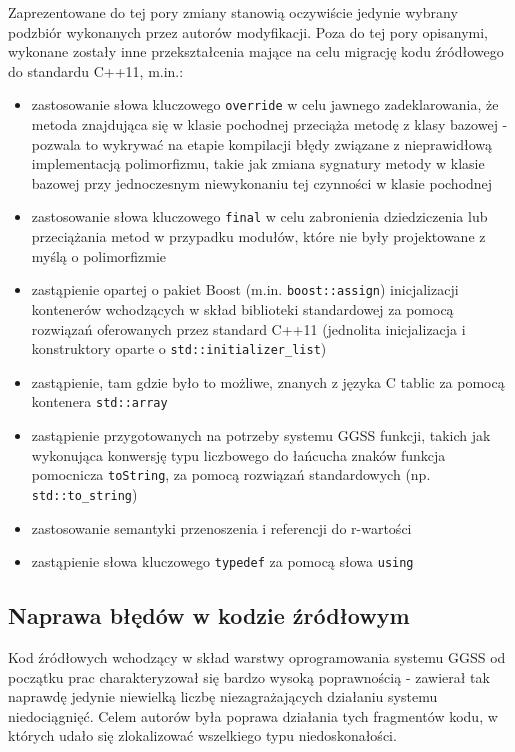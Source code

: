 Zaprezentowane do tej pory zmiany stanowią oczywiście jedynie wybrany podzbiór wykonanych przez autorów modyfikacji. Poza do tej pory opisanymi, wykonane zostały inne przekształcenia mające na celu migrację kodu źródłowego do standardu C++11, m.in.:
\begin{itemize}
    \item zastosowanie słowa kluczowego \lstinline{override} w celu jawnego zadeklarowania, że metoda znajdująca się w klasie pochodnej przeciąża metodę z klasy bazowej - pozwala to wykrywać na etapie kompilacji błędy związane z nieprawidłową implementacją polimorfizmu, takie jak zmiana sygnatury metody w klasie bazowej przy jednoczesnym niewykonaniu tej czynności w klasie pochodnej
    \item zastosowanie słowa kluczowego \lstinline{final} w celu zabronienia dziedziczenia lub przeciążania metod w przypadku modułów, które nie były projektowane z myślą o polimorfizmie
    \item zastąpienie opartej o pakiet Boost (m.in. \lstinline{boost::assign}) inicjalizacji kontenerów wchodzących w skład biblioteki standardowej za pomocą rozwiązań oferowanych przez standard C++11 (jednolita inicjalizacja i konstruktory oparte o \lstinline{std::initializer_list})
    \item zastąpienie, tam gdzie było to możliwe, znanych z języka C tablic za pomocą kontenera \lstinline{std::array}
    \item zastąpienie przygotowanych na potrzeby systemu GGSS funkcji, takich jak wykonująca konwersję typu liczbowego do łańcucha znaków funkcja pomocnicza \lstinline{toString}, za pomocą rozwiązań standardowych (np. \lstinline{std::to_string})
    \item zastosowanie semantyki przenoszenia i referencji do r-wartości
    \item zastąpienie słowa kluczowego \lstinline{typedef} za pomocą słowa \lstinline{using}
\end{itemize}

\subsection{Naprawa błędów w kodzie źródłowym}
Kod źródłowych wchodzący w skład warstwy oprogramowania systemu GGSS od początku prac charakteryzował się bardzo wysoką poprawnością - zawierał tak naprawdę jedynie niewielką liczbę niezagrażających działaniu systemu niedociągnięć. Celem autorów była poprawa działania tych fragmentów kodu, w których udało się zlokalizować wszelkiego typu niedoskonałości. 

